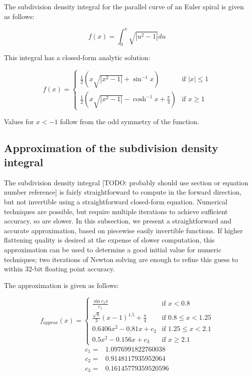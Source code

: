 \documentclass[sigconf, authordraft]{acmart}
\begin{document}
The subdivision density integral for the parallel curve of an Euler spiral is given as follows:

\[
    f(x) = \int_0^x\sqrt{|u^2 - 1|} du
\]

This integral has a closed-form analytic solution:

\[
    f(x) = \left\{
        \begin{array}{rl}
            \frac{1}{2}(x\sqrt{|x^2-1|} + \sin^{-1}x) & \text{if } |x| \leq 1 \\
            \frac{1}{2}(x\sqrt{|x^2-1|} - \cosh^{-1}x + \frac{\pi}{4}) & \text{if } x \geq 1
        \end{array}
    \right.
\]

Values for $x<-1$ follow from the odd symmetry of the function. 


\subsection{Approximation of the subdivision density integral}

The subdivision density integral [TODO: probably should use section or equation number reference] is fairly straightforward to compute in the forward direction, but not invertible using a straightforward closed-form equation. Numerical techniques are possible, but require multiple iterations to achieve sufficient accuracy, so are slower. In this subsection, we present a straightforward and accurate approximation, based on piecewise easily invertible functions. If higher flattening quality is desired at the expense of slower computation, this approximation can be used to determine a good initial value for numeric techniques; two iterations of Newton solving are enough to refine this guess to within 32-bit floating point accuracy.

The approximation is given as follows:

\[ 
    f_\mathit{approx}(x) = \left\{
        \begin{array}{rl}
            \frac{\sin c_1 x}{c_1} & \text{if } x < 0.8 \\
            \frac{\sqrt{8}}{3}(x-1)^{1.5} + \frac{\pi}{4} & \text{if } 0.8 \leq x < 1.25 \\
            0.6406x^2 - 0.81x + c_2 & \text{if } 1.25 \leq x < 2.1 \\
            0.5x^2 - 0.156x + c_3 & \text{if } x \geq 2.1
        \end{array}
        \right.
\]
\[
    \begin{array}{ll}
        c_1 = & 1.0976991822760038 \\
        c_2 = & 0.9148117935952064 \\
        c_3 = & 0.16145779359520596
    \end{array}
\]
\end{document}

